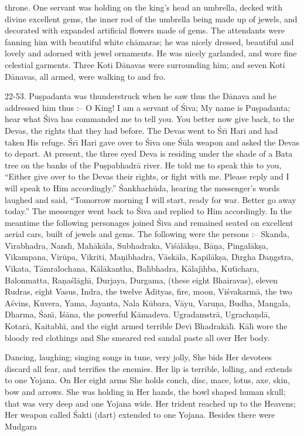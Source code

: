 throne. One servant was holding on the king's head an umbrella, decked with divine excellent gems, the inner rod of the umbrella being made up of jewels, and decorated with expanded artificial flowers made of gems. The attendants were fanning him with beautiful white ch\=amaras; he was nicely dressed, beautiful and lovely and adorned with jewel ornaments. He was nicely garlanded, and wore fine celestial garments. Three Koti D\=anavas were surrounding him; and seven Koti D\=anavas, all armed, were walking to and fro.

22-53. Pu\d{s}padanta was thunderstruck when he saw thus the D\=anava and he addressed him thus :-- O King! I am a servant of \'Siva; My name is Pu\d{s}padanta; hear what \'Siva has commanded me to tell you. You better now give back, to the Devas, the rights that they had before. The Devas went to \'Sr\={\i} Hari and had taken His refuge. \'Sr\={\i} Hari gave over to \'Siva one \'S\=ula weapon and asked the Devas to depart. At present, the three eyed Deva is residing under the shade of a Bata tree on the banks of the Pu\d{s}pabhadr\=a river. He told me to speak this to you, ``Either give over to the Devas their rights, or fight with me. Please reply and I will speak to Him accordingly.'' \'Sankhach\=uda, hearing the messenger's words laughed and said, ``Tomorrow morning I will start, ready for war. Better go away today.'' The messenger went back to \'Siva and replied to Him accordingly. In the meantime the following personages joined \'Siva and remained seated on excellent aerial cars, built of jewels and gems. The following were the persons :-- Skanda, V\={\i}rabhadra, Nand\={\i}, Mah\=ak\=ala, Subhadraka, Vi\'s\=al\=ak\d{s}a, B\=a\d{n}a, Pingal\=ak\d{s}a, Vikampana, Vir\=upa, Vikriti, Ma\d{n}ibhadra, V\=ask\=ala, Kapil\=ak\d{s}a, D\={\i}rgha Da\d{n}gstra, Vikata, T\=amralochana, K\=al\=akantha, Bal\={\i}bhadra, K\=alaj\={\i}hba, Kut\={\i}chara, Balonmatta, Ra\d{n}a\'sl\=agh\={\i}, Durjaya, Durgama, (these eight Bhairavas), eleven Rudras, eight Vasus, Indra, the twelve \=Adityas, fire, moon, Vi\'svakarm\=a, the two A\'svins, Kuvera, Yama, Jayanta, Nala K\=ubara, V\=ayu, Varu\d{n}a, Budha, Mangala, Dharma, \'San\={\i}, I\'s\=ana, the powerful K\=amadeva. Ugradamstr\=a, Ugracha\d{n}d\=a, Kotar\=a, Kaitabh\={\i}, and the eight armed terrible Dev\={\i} Bhadrak\=al\={\i}. K\=al\={\i} wore the bloody red clothings and She smeared red sandal paste all over Her body.

Dancing, laughing; singing songs in tune, very jolly, She bids Her devotees discard all fear, and terrifies the enemies. Her lip is terrible, lolling, and extends to one Yojana. On Her eight arms She holds conch, disc, mace, lotus, axe, skin, bow and arrows. She was holding in Her hands, the bowl shaped human skull; that was very deep and one Yojana wide. Her trident reached up to the Heavens; Her weapon called \'Sakti (dart) extended to one Yojana. Besides there were Mudgara

